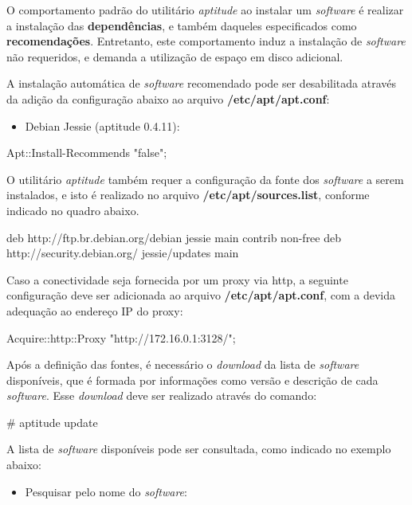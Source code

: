     O comportamento padrão do utilitário {\it aptitude} ao instalar um
{\it software} é realizar a instalação das {\bf dependências}, e também
daqueles especificados como {\bf recomendações}. Entretanto, este
comportamento induz a instalação de {\it software} não requeridos, e
demanda a utilização de espaço em disco adicional.

    A instalação automática de {\it software} recomendado pode ser
desabilitada através da adição da configuração abaixo ao arquivo
{\bf /etc/apt/apt.conf}:


\begin{itemize}
\item{\bf }Debian Jessie (aptitude 0.4.11):
\end{itemize}

\begin{BoxVerbatim}
Apt::Install-Recommends "false";
\end{BoxVerbatim}

    O utilitário {\it aptitude} também requer a configuração da fonte dos
{\it software} a serem instalados, e isto é realizado no arquivo
{\bf /etc/apt/sources.list}, conforme indicado no quadro abaixo.

\begin{BoxVerbatim}
deb http://ftp.br.debian.org/debian jessie main contrib non-free
deb http://security.debian.org/ jessie/updates main
\end{BoxVerbatim}

    Caso a conectividade seja fornecida por um proxy via http, a seguinte
configuração deve ser adicionada ao arquivo {\bf /etc/apt/apt.conf}, com a
devida adequação ao endereço IP do proxy:

\begin{BoxVerbatim}
Acquire::http::Proxy "http://172.16.0.1:3128/";
\end{BoxVerbatim}

    Após a definição das fontes, é necessário o {\it download} da lista de
{\it software} disponíveis, que é formada por informações como versão e descrição de
cada {\it software}. Esse {\it download} deve ser realizado através do comando:

\begin{BoxVerbatim}
    # aptitude update
\end{BoxVerbatim}

    A lista de {\it software} disponíveis pode ser consultada, como indicado
no exemplo abaixo:

\begin{itemize}
\item{\bf }Pesquisar pelo nome do {\it software}:
\end{itemize}

